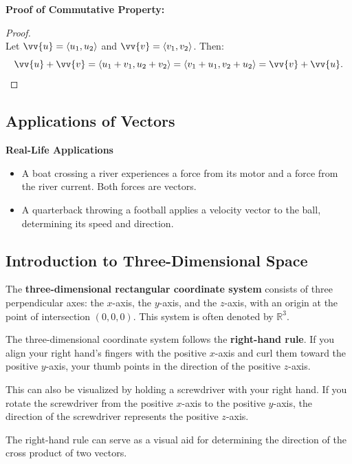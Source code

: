 \documentclass{article}
\begin{document}
\begin{proofbox}
    \textbf{Proof of Commutative Property:}
    \begin{proof}
    \leavevmode\\
    Let \(\vv{u} = \langle u_1, u_2 \rangle\) and \(\vv{v} = \langle v_1, v_2 \rangle\). Then:
    \[
    \vv{u} + \vv{v} = \langle u_1 + v_1, u_2 + v_2 \rangle = \langle v_1 + u_1, v_2 + u_2 \rangle = \vv{v} + \vv{u}.
    \]
    \end{proof}
\end{proofbox}

\subsection*{Applications of Vectors}

\begin{examplebox}
    \textbf{Real-Life Applications}
    \begin{itemize}
        \item A boat crossing a river experiences a force from its motor and a force from the river current. Both forces are vectors.
        \item A quarterback throwing a football applies a velocity vector to the ball, determining its speed and direction.
    \end{itemize}
\end{examplebox}

\subsection*{Introduction to Three-Dimensional Space}

The \textbf{three-dimensional rectangular coordinate system} consists of three perpendicular axes: the \(x\)-axis, the \(y\)-axis, and the \(z\)-axis, with an origin at the point of intersection \((0, 0, 0)\). This system is often denoted by \(\mathbb{R}^3\).

\begin{tipbox}
    The three-dimensional coordinate system follows the \textbf{right-hand rule}. If you align your right hand’s fingers with the positive \(x\)-axis and curl them toward the positive \(y\)-axis, your thumb points in the direction of the positive \(z\)-axis.
    \begin{remarkbox}
        This can also be visualized by holding a screwdriver with your right hand. If you rotate the screwdriver from the positive \(x\)-axis to the positive \(y\)-axis, the direction of the screwdriver represents the positive \(z\)-axis.
    \end{remarkbox}
    \begin{notebox}
        The right-hand rule can serve as a visual aid for determining the direction of the cross product of two vectors.
    \end{notebox}
\end{tipbox}
\end{document}
